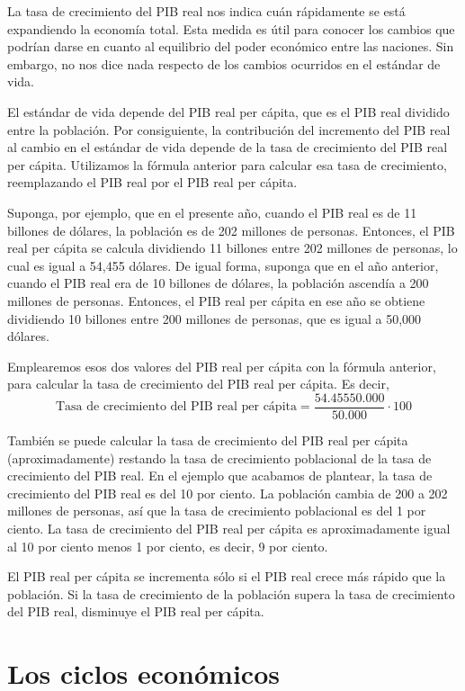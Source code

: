 \documentclass[
]{krantz}
\begin{document}
La tasa de crecimiento del PIB real nos indica cuán rápidamente se está expandiendo la economía total. Esta medida es útil para conocer los cambios que podrían darse en cuanto al equilibrio del poder económico entre las naciones. Sin embargo, no nos dice nada respecto de los cambios ocurridos en el estándar de vida.

El estándar de vida depende del PIB real per cápita, que es el PIB real dividido entre la población. Por consiguiente, la contribución del incremento del PIB real al cambio en el estándar de vida depende de la tasa de crecimiento del PIB real per cápita. Utilizamos la fórmula anterior para calcular esa tasa de crecimiento, reemplazando el PIB real por el PIB real per cápita.

Suponga, por ejemplo, que en el presente año, cuando el PIB real es de 11 billones de dólares, la población es de 202 millones de personas. Entonces, el PIB real per cápita se calcula dividiendo 11 billones entre 202 millones de personas, lo cual es igual a 54,455 dólares. De igual forma, suponga que en el año anterior, cuando el PIB real era de 10 billones de dólares, la población ascendía a 200 millones de personas. Entonces, el PIB real per cápita en ese año se obtiene dividiendo 10 billones entre 200 millones de personas, que es igual a 50,000 dólares.

Emplearemos esos dos valores del PIB real per cápita con la fórmula anterior, para calcular la tasa de crecimiento del PIB real per cápita. Es decir,
\[\mathrm {\text{Tasa de crecimiento del PIB real per cápita} = \frac{54.455 50.000}{50.000}·100}\]

También se puede calcular la tasa de crecimiento del PIB real per cápita (aproximadamente) restando la tasa de crecimiento poblacional de la tasa de crecimiento del PIB real. En el ejemplo que acabamos de plantear, la tasa de crecimiento del PIB real es del 10 por ciento. La población cambia de 200 a 202 millones de personas, así que la tasa de crecimiento poblacional es del 1 por ciento. La tasa de crecimiento del PIB real per cápita es aproximadamente igual al 10 por ciento menos 1 por ciento, es decir, 9 por ciento.

El PIB real per cápita se incrementa sólo si el PIB real crece más rápido que la población. Si la tasa de crecimiento de la población supera la tasa de crecimiento del PIB real, disminuye el PIB real per cápita.

\hypertarget{los-ciclos-econuxf3micos}{%
\section{Los ciclos económicos}\label{los-ciclos-econuxf3micos}}
\end{document}
